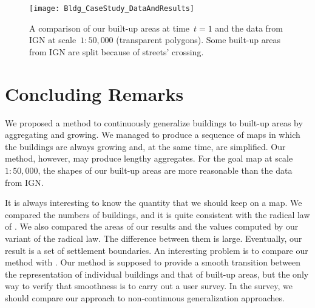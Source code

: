 \begin{figure*}[tb]
	\centering
	\texttt{[image: Bldg\_CaseStudy\_DataAndResults]}
	\caption{A comparison of our built-up areas at time~$t=1$
		and the data from IGN
		at scale~$1:50{,}000$ (transparent polygons).
		Some built-up areas from IGN are split 
		because of streets' crossing.
	}
	\label{fig:ExperimentalComparison}
\end{figure*}




\section{Concluding Remarks}
\label{sec:Conclusion}

We proposed a method to continuously generalize 
buildings to built-up areas
by aggregating and growing.
We managed to produce a sequence of maps in which 
the buildings are always growing and, 
at the same time, are simplified.
Our method, however, may produce lengthy aggregates.
For the goal map at scale~$1:50{,}000$,
the shapes of our built-up areas are more reasonable 
than the data from IGN.

It is always interesting to know the quantity that
we should keep on a map.
We compared the numbers of buildings, 
and it is quite consistent 
with the radical law of \citet{Topfer1966}.
We also compared the areas of our results 
and the values computed by our variant of the radical law.
The difference between them is large.
Eventually, our result is a set of settlement boundaries. 
An interesting problem is to 
compare our method with \citet{Chaudhry2008}.
Our method is supposed to provide a smooth transition 
between the representation of individual buildings and 
that of built-up areas, 
but the only way to verify that smoothness
is to carry out a user survey.
In the survey, we should compare our approach to 
non-continuous generalization approaches.





